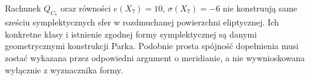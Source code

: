 \begin{uwaga}
Rachunek $Q_{C_7}$ oraz równości
$e(X_7)=10$, $\sigma(X_7)=-6$ nie konstruują same
sześciu symplektycznych sfer w rozdmuchanej powierzchni
eliptycznej. Ich konkretne klasy i istnienie zgodnej
formy symplektycznej są danymi geometrycznymi konstrukcji
Parka. Podobnie prosta spójność dopełnienia musi zostać
wykazana przez odpowiedni argument o meridianie,
a nie wywnioskowana wyłącznie z wyznacznika formy.
\end{uwaga}

